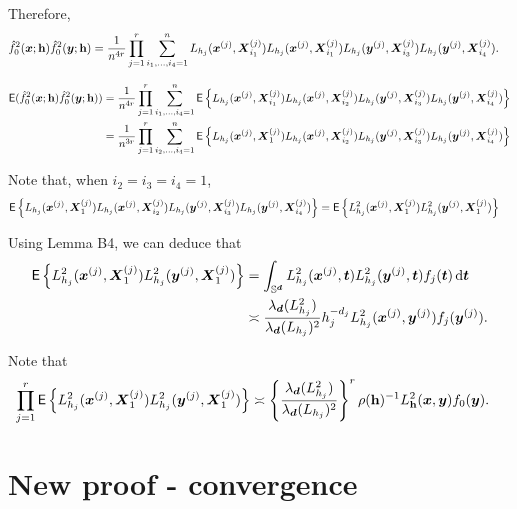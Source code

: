 \documentclass{article}
\begin{document}
Therefore,
\begin{align*}
    \hat{f}_{0}^2(\boldsymbol{x};\mathbf h)\hat{f}_{0}^2(\boldsymbol{y};\mathbf h) &= \frac{1}{n^{4r}} \prod_{j=1}^{r} \sum_{i_1,\dots,i_4 = 1}^{n} L_{h_j} (\boldsymbol{x}^{(j)}, \boldsymbol{X}_{i_1}^{(j)}) L_{h_j} (\boldsymbol{x}^{(j)}, \boldsymbol{X}_{i_1}^{(j)})
    L_{h_j} (\boldsymbol{y}^{(j)}, \boldsymbol{X}_{i_3}^{(j)}) L_{h_j} (\boldsymbol{y}^{(j)}, \boldsymbol{X}_{i_4}^{(j)}).
\end{align*}

\begin{align*}
    \mathsf{E} (\hat{f}_{0}^2(\boldsymbol{x};\mathbf h)\hat{f}_{0}^2(\boldsymbol{y};\mathbf h)) &= \frac{1}{n^{4r}} \prod_{j=1}^{r} \sum_{i_1,\dots,i_4 = 1}^{n} \mathsf{E} \left\{ L_{h_j} (\boldsymbol{x}^{(j)}, \boldsymbol{X}_{i_1}^{(j)}) L_{h_j} (\boldsymbol{x}^{(j)}, \boldsymbol{X}_{i_2}^{(j)})
    L_{h_j} (\boldsymbol{y}^{(j)}, \boldsymbol{X}_{i_3}^{(j)}) L_{h_j} (\boldsymbol{y}^{(j)}, \boldsymbol{X}_{i_4}^{(j)}) \right\} \\
    &= \frac{1}{n^{3r}} \prod_{j=1}^{r} \sum_{i_2,\dots,i_4 = 1}^{n} \mathsf{E} \left\{ L_{h_j} (\boldsymbol{x}^{(j)}, \boldsymbol{X}_{1}^{(j)}) L_{h_j} (\boldsymbol{x}^{(j)}, \boldsymbol{X}_{i_2}^{(j)})
    L_{h_j} (\boldsymbol{y}^{(j)}, \boldsymbol{X}_{i_3}^{(j)}) L_{h_j} (\boldsymbol{y}^{(j)}, \boldsymbol{X}_{i_4}^{(j)}) \right\}
\end{align*}

Note that, when $i_2 = i_3 = i_4 = 1$,
\begin{align*}
     \mathsf{E} \left\{ L_{h_j} (\boldsymbol{x}^{(j)}, \boldsymbol{X}_{1}^{(j)}) L_{h_j} (\boldsymbol{x}^{(j)}, \boldsymbol{X}_{i_2}^{(j)})
    L_{h_j} (\boldsymbol{y}^{(j)}, \boldsymbol{X}_{i_3}^{(j)}) L_{h_j} (\boldsymbol{y}^{(j)}, \boldsymbol{X}_{i_4}^{(j)}) \right\} &= \mathsf{E} \left\{ L_{h_j}^2 (\boldsymbol{x}^{(j)}, \boldsymbol{X}_{1}^{(j)})
    L_{h_j}^2 (\boldsymbol{y}^{(j)}, \boldsymbol{X}_{1}^{(j)}) \right\}
\end{align*}

Using Lemma B4, we can deduce that
\begin{align*}
    \mathsf{E} \left\{ L_{h_j}^2 (\boldsymbol{x}^{(j)}, \boldsymbol{X}_{1}^{(j)})
    L_{h_j}^2 (\boldsymbol{y}^{(j)}, \boldsymbol{X}_{1}^{(j)}) \right\} &= \int_{\mathbb{S}^{\boldsymbol{d}}}  L_{h_j}^2 (\boldsymbol{x}^{(j)}, \boldsymbol{t})
    L_{h_j}^2 (\boldsymbol{y}^{(j)}, \boldsymbol{t}) f_j(\boldsymbol{t}) \,\mathrm{d} \boldsymbol{t} \\
    & \asymp \frac{\lambda_{\boldsymbol{d}}(L_{h_j}^2)}{\lambda_{\boldsymbol{d}}(L_{h_j})^2} h_j^{-d_j} L_{h_j}^2 (\boldsymbol{x}^{(j)}, \boldsymbol{y}^{(j)}) f_j(\boldsymbol{y}^{(j)}).
\end{align*}

Note that
\begin{align*}
    \prod_{j=1}^{r} \mathsf{E} \left\{ L_{h_j}^2 (\boldsymbol{x}^{(j)}, \boldsymbol{X}_{1}^{(j)})
    L_{h_j}^2 (\boldsymbol{y}^{(j)}, \boldsymbol{X}_{1}^{(j)}) \right\} & \asymp \left\{ \frac{\lambda_{\boldsymbol{d}}(L_{h_j}^2)}{\lambda_{\boldsymbol{d}}(L_{h_j})^2} \right\}^r \rho(\mathbf h)^{-1} L_{\mathbf h}^2 (\boldsymbol{x}, \boldsymbol{y}) f_0(\boldsymbol{y}).
\end{align*}

\section{New proof - convergence}
\end{document}
